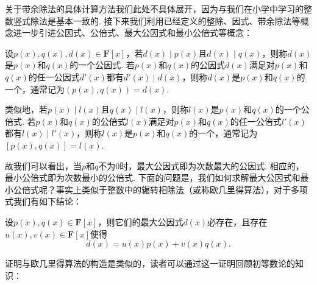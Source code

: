 关于带余除法的具体计算方法我们此处不具体展开，因为与我们在小学中学习的整数竖式除法是基本一致的. 接下来我们利用已经定义的整除、因式、带余除法等概念进一步引进公因式、公倍式、最大公因式和最小公倍式等概念：
\begin{definition}
    设$p(x),q(x),d(x)\in\mathbf{F}[x]$，若$d(x) \mid p(x)$且$d(x) \mid q(x)$，则称$d(x)$是$p(x)$和$q(x)$的一个公因式. 若$p(x)$和$q(x)$的公因式$d(x)$满足对$p(x)$和$q(x)$的任一公因式$d'(x)$都有$d'(x) \mid d(x)$，则称$d(x)$是$p(x)$和$q(x)$的一个，通常记为$(p(x),q(x))=d(x)$.

    类似地，若$p(x) \mid l(x)$且$q(x) \mid l(x)$，则称$l(x)$是$p(x)$和$q(x)$的一个公倍式. 若$p(x)$和$q(x)$的公倍式$l(x)$满足对$p(x)$和$q(x)$的任一公倍式$l'(x)$都有$l(x) \mid l'(x)$，则称$l(x)$是$p(x)$和$q(x)$的一个，通常记为$[p(x),q(x)]=l(x)$.
\end{definition}
故我们可以看出，当$p$和$q$不为0时，最大公因式即为次数最大的公因式. 相应的，最小公倍式即为次数最小的公倍式. 下面的问题是，我们如何求解最大公因式和最小公倍式呢？事实上类似于整数中的辗转相除法（或称欧几里得算法），对于多项式我们有如下结论：
\begin{theorem} \label{thm:14:欧几里得算法}
    设$p(x),q(x)\in\mathbf{F}[x]$，则它们的最大公因式$d(x)$必存在，且存在$u(x),v(x)\in\mathbf{F}[x]$使得
    \begin{equation} \label{eq:14:欧几里得算法}
        d(x)=u(x)p(x)+v(x)q(x).
    \end{equation}
\end{theorem}
证明与欧几里得算法的构造是类似的，读者可以通过这一证明回顾初等数论的知识：
